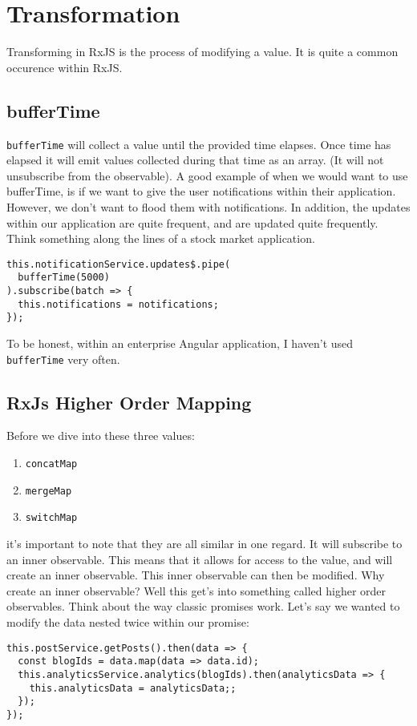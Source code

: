 \chapter{Transformation}
Transforming in RxJS is the process of modifying a value. It is quite 
a common occurence within RxJS.

\section{bufferTime}
\lstinline{bufferTime} will collect a value until the provided time elapses. 
Once time has elapsed it will emit values collected during that time as an 
array. (It will not unsubscribe from the observable). A good example of when we
would want to use bufferTime, is if we want to give the user notifications 
within their application. However, we don't want to flood them with 
notifications. In addition, the updates within our application are quite 
frequent, and are updated quite frequently. Think something along the lines of
a stock market application.

\begin{lstlisting}
this.notificationService.updates$.pipe(
  bufferTime(5000)
).subscribe(batch => {
  this.notifications = notifications;
});  
\end{lstlisting}

To be honest, within an enterprise Angular application, I haven't used 
\lstinline{bufferTime} very often. 

\section{RxJs Higher Order Mapping}
Before we dive into these three values:
\begin{enumerate}
  \item \lstinline{concatMap}
  \item \lstinline{mergeMap}
  \item \lstinline{switchMap}
\end{enumerate}

it's important to note that they are all similar in one regard. It will 
subscribe to an inner observable. This means that it allows for access to the 
value, and will create an inner observable. This inner observable can then be 
modified. Why create an inner observable? Well this get's into something called
higher order observables. Think about the way classic promises work. Let's say
we wanted to modify the data nested twice within our promise:
\begin{lstlisting}
this.postService.getPosts().then(data => {
  const blogIds = data.map(data => data.id);
  this.analyticsService.analytics(blogIds).then(analyticsData => {
    this.analyticsData = analyticsData;; 
  });
});  
\end{lstlisting}


